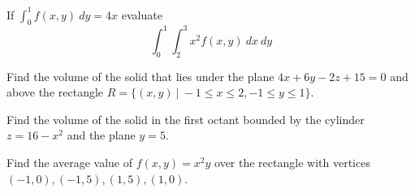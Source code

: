 \documentclass[12pt]{exam}
\begin{document}
\begin{questions}

\question If \(\int_0^1 f(x,y)~dy=4x\) evaluate
    \[
        \int_{0}^1\int_{2}^3 x^2f(x,y)~dx~dy
    \]
    \ifprintanswers
        \begin{solution}
        \end{solution}
    \else
        \vfill
    \fi

\question Find the volume of the solid that lies under the plane \(4x+6y-2z+15=0\) and above the rectangle \(R=\{(x,y)~|~-1\le x \le 2,-1\le y \le 1\}\).
\ifprintanswers
        \begin{solution}
        \end{solution}
    \else
        \vfill
    \fi 

\question Find the volume of the solid in the first octant bounded by the cylinder \(z=16-x^2\) and the plane \(y=5\).
\ifprintanswers
        \begin{solution}
        \end{solution}
    \else
        \vfill
    \fi 

\question Find the average value of \(f(x,y)=x^2y\) over the rectangle with vertices 
\((-1,0), (-1,5), (1,5), (1,0)\).
\ifprintanswers
        \begin{solution}
        \end{solution}
    \else
        \vfill
    \fi 





\end{questions}
\end{document}

